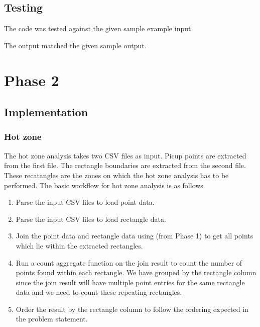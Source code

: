 \subsection{Testing}
The code was tested against the given sample example input.


The output matched the given sample output.


\newpage

\section{Phase 2} \label{Phase 2}

\subsection{Implementation}
\subsubsection{Hot zone}
The hot zone analysis takes two CSV files as input. Picup points are extracted from the first file. The rectangle boundaries are extracted from the second file. These recatangles are the zones on which the hot zone analysis has to be performed. The basic workflow for hot zone analysis is as follows

\begin{enumerate}
    \item Parse the input CSV files to load point data.
    \item Parse the input CSV files to load rectangle data.
    \item  Join the point data and rectangle data using  (from Phase 1) to get all points which lie within the extracted rectangles. 
    \item Run a count aggregate function on the join result to count the number of points found within each rectangle. We have grouped by the rectangle column since the join result will have multiple point entries for the same rectangle data and we need to count these repeating rectangles.
    \item Order the result by the rectangle column to follow the ordering expected in the problem statement.
\end{enumerate}

